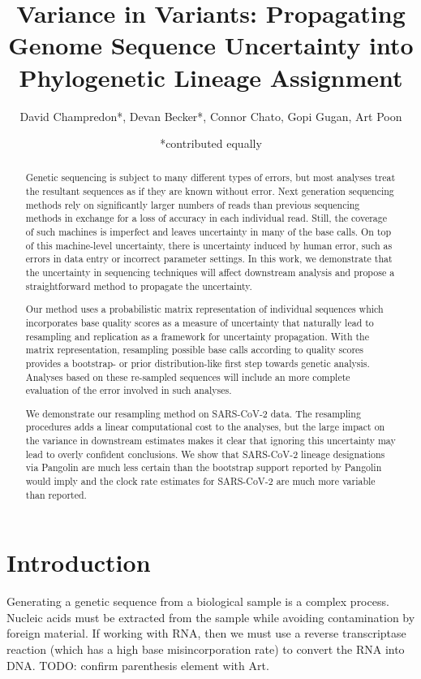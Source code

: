 \documentclass[10pt]{article}
\title{Variance in Variants: Propagating Genome Sequence Uncertainty
into Phylogenetic Lineage Assignment}
\author{David Champredon*, Devan Becker*, Connor Chato, Gopi Gugan, Art
Poon}
\date{*contributed equally}
\begin{document}
\maketitle

\normalsize
\vspace{1cm}
\tableofcontents

\begin{abstract}
Genetic sequencing is subject to many different types of errors, but most analyses treat the resultant sequences as if they are known without error.
Next generation sequencing methods rely on significantly larger numbers of reads than previous sequencing methods in exchange for a loss of accuracy in each individual read.
Still, the coverage of such machines is imperfect and leaves uncertainty in many of the base calls. 
On top of this machine-level uncertainty, there is uncertainty induced by human error, such as errors in data entry or incorrect parameter settings.
In this work, we demonstrate that the uncertainty in sequencing techniques will affect downstream analysis and propose a straightforward method to propagate the uncertainty.

Our method uses a probabilistic matrix representation of individual sequences which incorporates base quality scores as a measure of uncertainty that naturally lead to resampling and replication as a framework for uncertainty propagation.
With the matrix representation, resampling possible base calls according to quality scores provides a bootstrap- or prior distribution-like first step towards genetic analysis.
Analyses based on these re-sampled sequences will include an more complete evaluation of the error involved in such analyses.

We demonstrate our resampling method on SARS-CoV-2 data.
The resampling procedures adds a linear computational cost to the analyses, but the large impact on the variance in downstream estimates makes it clear that ignoring this uncertainty may lead to overly confident conclusions.
We show that SARS-CoV-2 lineage designations via Pangolin are much less certain than the bootstrap support reported by Pangolin would imply and the clock rate estimates for SARS-CoV-2 are much more variable than reported.
\end{abstract}


\section{Introduction}

Generating a genetic sequence from a biological sample is a complex process.
Nucleic acids must be extracted from the sample while avoiding contamination by foreign material.
If working with RNA, then we must use a reverse transcriptase reaction (which has a high base misincorporation rate) to convert the RNA into DNA. TODO: confirm parenthesis element with Art.
\end{document}
